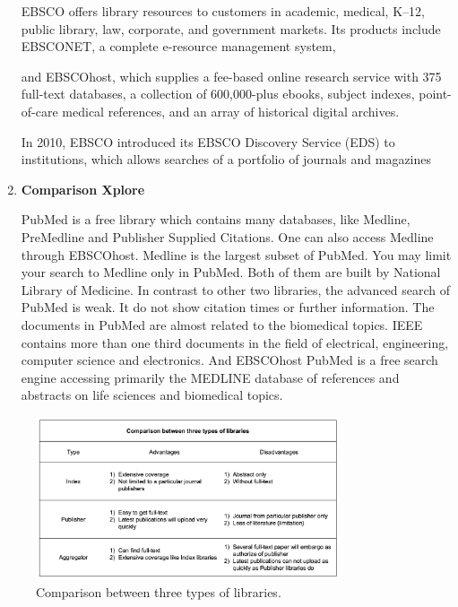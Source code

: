 \begin{enumerate}
    EBSCO offers library resources to customers in academic, medical, K–12,  
    public library, law, corporate, and government markets. Its products include EBSCONET, a complete e-resource management system, 

    and EBSCOhost, which supplies a fee-based online research 
    service with 375 full-text databases, a collection
    of 600,000-plus ebooks, subject indexes, point-of-care 
    medical references, and an array of historical digital archives.

    In 2010, EBSCO introduced its EBSCO Discovery Service (EDS) to institutions,
    which allows searches of a portfolio of journals and magazines

	
	\item\textbf{Comparison Xplore}
	\setlength{\parindent}{1em}
	
	PubMed is a free library which contains many databases, like Medline, PreMedline and Publisher Supplied Citations.
    One can also access Medline through EBSCOhost. 
    Medline is the largest subset of PubMed. 
    You may limit your search to Medline only in PubMed. 
    Both of them are built by National Library of Medicine. 
    In contrast to other two libraries, the advanced search of PubMed is weak. 
    It do not show citation times or further information.
    The documents in PubMed are almost related to the biomedical topics.
    IEEE contains more than one third documents in the field of electrical, engineering, computer science and electronics.
    And EBSCOhost PubMed is a free search engine accessing primarily the MEDLINE 
    database of references and abstracts on life sciences and biomedical topics. 
    

\end{enumerate}


\begin{figure}[htb]
	\begin{center}
		\includegraphics[width=0.8\textwidth]{Wolverine_Background_Chart_1}
	\end{center}
	\caption{Comparison between three types of libraries.\label{WBC1}}
\end{figure}
\newpage
